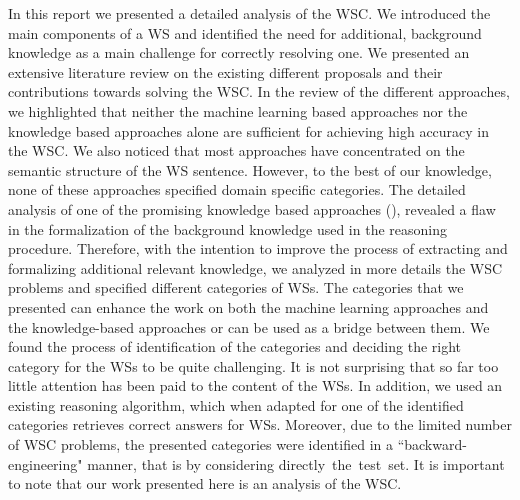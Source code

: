 In this report we presented a detailed analysis of the WSC. We introduced the main components of a WS and identified the need for  additional, background knowledge as a main challenge for correctly resolving one. We presented an extensive literature review on the existing different proposals and their contributions towards solving the WSC. In the review of the different approaches, we highlighted that neither the machine learning based approaches nor the knowledge based approaches alone are sufficient for achieving high accuracy in the WSC. We also noticed that most approaches have concentrated on the semantic structure of the WS sentence. However, to the best of our knowledge, none of these approaches specified domain specific categories. The detailed analysis of one of the promising knowledge based approaches (\cite{2018CommonsenseKT}), revealed a flaw in the formalization of the background knowledge used in the reasoning procedure. Therefore, with the intention to improve the process of extracting and formalizing additional relevant knowledge, we analyzed in more details the WSC problems and specified different categories of WSs. The categories that we presented can enhance the work on both the machine learning approaches and the knowledge-based approaches or can be used as a bridge between them. We found the process of identification of the categories and deciding the right category for the WSs to be quite challenging. It is not surprising that so far too little attention has been paid to the content of the WSs. In addition, we used an existing reasoning algorithm, which when adapted for one of the identified categories retrieves correct answers for WSs. 
Moreover, due to the limited number of WSC problems, the presented categories were identified in a ``backward-engineering" manner, that is by considering directly~the~test~set. It is important to note that our work presented here is an analysis of the WSC.


